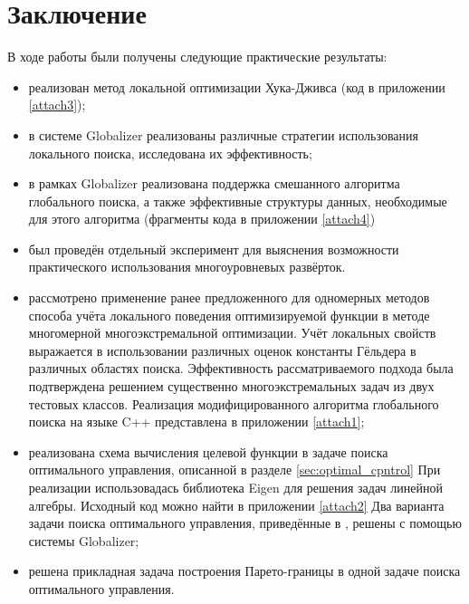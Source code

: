 \section{Заключение}
В ходе работы были получены следующие практические результаты:
\begin{itemize}
  \item реализован метод локальной оптимизации Хука-Дживса (код в приложении \ref{attach3});
  \item в системе Globalizer реализованы различные стратегии использования локального поиска,
  исследована их эффективность;
  \item в рамках Globalizer реализована поддержка смешанного алгоритма глобального поиска,
  а также эффективные структуры данных, необходимые для этого алгоритма (фрагменты кода в приложении \ref{attach4})
  \item был проведён отдельный эксперимент для выяснения возможности практического использования многоуровневых развёрток.
  \item рассмотрено применение ранее предложенного для одномерных методов способа учёта
  локального поведения оптимизируемой функции в методе многомерной многоэкстремальной
  оптимизации. Учёт локальных свойств выражается в использовании различных оценок
  константы Гёльдера в различных областях поиска. Эффективность рассматриваемого подхода
  была подтверждена решением существенно многоэкстремальных задач из двух тестовых классов.
  Реализация модифицированного алгоритма глобального поиска на языке C++ представлена
  в приложении \ref{attach1};
  \item реализована схема вычисления целевой функции в задаче поиска оптимального управления,
  описанной в разделе \ref{sec:optimal_cpntrol}
  При реализации использовадась библиотека Eigen \cite{eigenLib} для решения задач
  линейной алгебры. Исходный код можно найти в приложении \ref{attach2}
  Два варианта задачи поиска оптимального управления,
  приведённые в \cite{optControl}, решены с помощью системы Globalizer;
  \item решена прикладная задача построения Парето-границы в одной задаче поиска оптимального
  управления.
\end{itemize}
